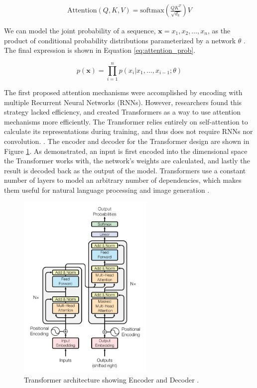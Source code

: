 \documentclass[letterpaper]{article} %
\begin{document}
\begin{equation}
\label{eq:attention}
\begin{split}
\text{Attention}(Q,K,V) = \text{softmax}(\frac{QK^T}{\sqrt{d_k}})V
\end{split}
\end{equation}

We can model the joint probability of a sequence,
$\mathbf{x}={x_1,x_2,\dots,x_n}$,
as the product of conditional
probability distributions parameterized by a network $\theta$
\cite{generative_transformers}.
The final expression is shown in Equation \ref{eq:attention_prob}.

\begin{equation}
\label{eq:attention_prob}
p(\mathbf{x}) = \prod_{i=1}^{n}p(x_i|x_1,\dots,x_{i-1};\theta)
\end{equation}

The first proposed attention mechanisms were accomplished by encoding with 
multiple Recurrent Neural Networks (RNNs). However, researchers found this 
strategy lacked efficiency, and created Transformers as
a way to use attention mechanisms more efficiently.
The Transformer relies entirely on self-attention to calculate its 
representations during training, and thus does not require RNNs nor convolution.
\cite{attention_need}.
The encoder and decoder for the Transformer design
are shown in Figure \ref{fig:transformer}.
As demonstrated, an input is first encoded into the dimensional space
the Transformer works with, the network's weights are calculated,
and lastly the result is decoded back as the output of the model.
Transformers use a constant number of layers to model an arbitrary number of 
dependencies, which makes them useful for natural language processing and 
image generation \cite{generative_transformers}.

\begin{figure}[htbp]
\centerline{\includegraphics[width=6.5cm]{transformer.png}}
\caption{Transformer architecture showing Encoder and Decoder
\cite{attention_need}.}
\label{fig:transformer}
\end{figure}
\end{document}
